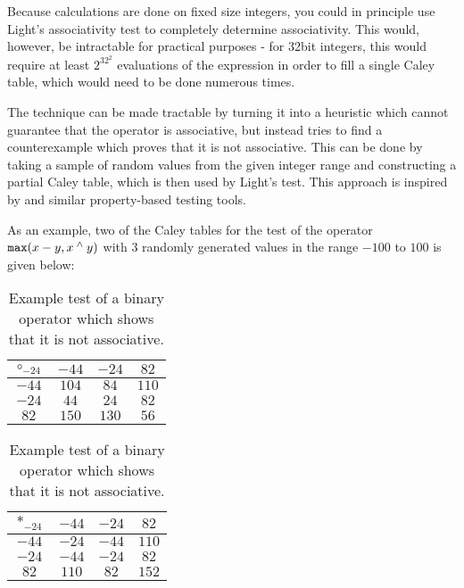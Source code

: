 Because calculations are done on fixed size integers, you could in principle use Light's
associativity test to completely determine associativity. This would, however, be
intractable for practical purposes - for 32bit integers, this would require at least
$2^{32^{2}}$ evaluations of the expression in order to fill a single Caley table, which
would need to be done numerous times.

The technique can be made tractable by turning it into a heuristic which cannot guarantee
that the operator is associative, but instead tries to find a counterexample which proves
that it is not associative. This can be done by taking a sample of random values from the
given integer range and constructing a partial Caley table, which is then used by Light's
test. This approach is inspired by \cite{quickcheck} and similar property-based
testing tools.

As an example, two of the Caley tables for the test of the operator $\texttt{max}(x - y, x \mathbin{^\wedge} y)$
with 3 randomly generated values in the range $-100$ to $100$ is given below:

\begin{table}[h!]
  \def\arraystretch{1.2}
  \begin{tabular}{|c|ccc|}
    \hline
    $\circ_{-24}$ & $-44$ & $-24$ & $82$ \\
    \hline
        $-44$ & $104$ & $84$  & $110$ \\ 
        $-24$ & $44$  & $24$  & $82$  \\
        $82$  & $150$ & $130$ & $56$  \\
    \hline
  \end{tabular}
\quad
  \begin{tabular}{|c|ccc|}
    \hline
    $*_{-24}$ & $-44$ & $-24$ & $82$ \\
    \hline
        $-44$ & $-24$ & $-44$  & $110$ \\ 
        $-24$ & $-44$  & $-24$  & $82$  \\
        $82$  & $110$ & $82$ & $152$  \\
    \hline
  \end{tabular}
  \centering
  \caption{Example test of a binary operator which shows that it is not associative.}
\end{table}


